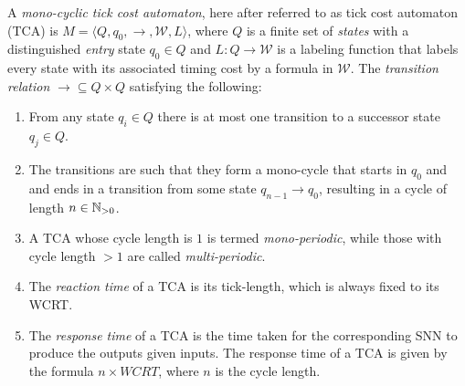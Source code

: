 \begin{definition}
	A \emph{mono-cyclic tick cost automaton}, here after referred to as tick cost automaton (\ac{TCA}) 
	is %
	$M = \langle Q, q_0, \rightarrow, \mathcal{W}, L
	\rangle$, where $Q$ is a finite set of \emph{states} with a
	distinguished \emph{entry} state $q_0 \in Q$ and $L: Q \rightarrow \mathcal{W}$ is
	a labeling function that labels every state with its associated timing cost by a formula in $\mathcal{W}$.
	The \emph{transition relation}
	${\rightarrow} \subseteq Q \times Q$ satisfying the following:
	
	\begin{enumerate}
		\item From any state $q_i \in Q$ there is at most one transition to a successor state $q_j \in Q$.
		\item The transitions are such that they form a mono-cycle that starts in $q_0$ and and ends in a 
		transition from some state $q_{n-1} \rightarrow q_0$, resulting in a
		cycle of length $n \in {\mathbb N}_{>0}$.
		\item A \ac{TCA} whose cycle length is $1$ is termed
		\emph{mono-periodic}, while those with cycle length $>1$ are called
		\emph{multi-periodic}.
		\item The \emph{reaction time} of a \ac{TCA} is its tick-length, which is
		always fixed to its \ac{WCRT}. 
		\item The \emph{response time} of a \ac{TCA} is the time taken for the
		corresponding \ac{SNN} to produce the outputs given inputs. 
		The response time of a TCA is given by the formula $n \times WCRT$,
		where $n$ is the cycle length.
	\end{enumerate}
	\label{def:tca}
\end{definition}

